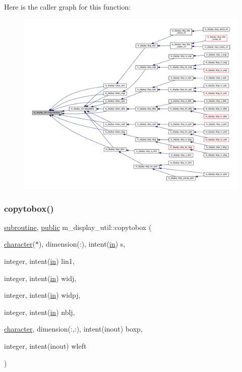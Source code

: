 Here is the caller graph for this function\+:
\nopagebreak
\begin{figure}[H]
\begin{center}
\leavevmode
\includegraphics[width=350pt]{namespacem__display__util_ab8090500f628c3475b88b0068c6788a4_icgraph}
\end{center}
\end{figure}
\mbox{\label{namespacem__display__util_aca56756281a372cd4d186a032dd426fb}} 
\subsubsection{\texorpdfstring{copytobox()}{copytobox()}}
{\footnotesize\ttfamily \hyperlink{M__stopwatch_83_8txt_acfbcff50169d691ff02d4a123ed70482}{subroutine}, \hyperlink{M__stopwatch_83_8txt_a2f74811300c361e53b430611a7d1769f}{public} m\+\_\+display\+\_\+util\+::copytobox (\begin{DoxyParamCaption}\item[{\hyperlink{option__stopwatch_83_8txt_abd4b21fbbd175834027b5224bfe97e66}{character}($\ast$), dimension(\+:), intent(\hyperlink{M__journal_83_8txt_afce72651d1eed785a2132bee863b2f38}{in})}]{s,  }\item[{integer, intent(\hyperlink{M__journal_83_8txt_afce72651d1eed785a2132bee863b2f38}{in})}]{lin1,  }\item[{integer, intent(\hyperlink{M__journal_83_8txt_afce72651d1eed785a2132bee863b2f38}{in})}]{widj,  }\item[{integer, intent(\hyperlink{M__journal_83_8txt_afce72651d1eed785a2132bee863b2f38}{in})}]{widpj,  }\item[{integer, intent(\hyperlink{M__journal_83_8txt_afce72651d1eed785a2132bee863b2f38}{in})}]{nblj,  }\item[{\hyperlink{option__stopwatch_83_8txt_abd4b21fbbd175834027b5224bfe97e66}{character}, dimension(\+:,\+:), intent(inout)}]{boxp,  }\item[{integer, intent(inout)}]{wleft }\end{DoxyParamCaption})}


